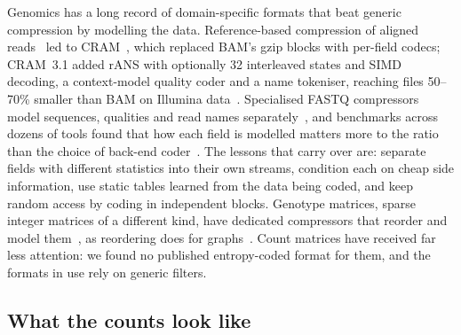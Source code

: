 Genomics has a long record of domain-specific formats that beat generic compression by modelling the data.
Reference-based compression of aligned reads~\cite{fritz2011efficient} led to CRAM~\cite{cochrane2013facing}, which
replaced BAM's gzip blocks with per-field codecs; CRAM~3.1 added rANS with optionally 32 interleaved states and SIMD
decoding, a context-model quality coder and a name tokeniser, reaching files 50--70\% smaller than BAM on Illumina
data~\cite{bonfield2022cram}. Specialised FASTQ compressors model
sequences, qualities and read names separately~\cite{bonfield2013compression,chandak2019spring}, and benchmarks across
dozens of tools found that how each field is modelled matters more to the ratio than the choice of back-end
coder~\cite{numanagic2016comparison,hernaez2019genomic}.
The lessons that carry over are: separate fields with different statistics into their own streams, condition each
on cheap side information, use static tables learned from the data being coded, and keep random access by coding in
independent blocks. Genotype matrices, sparse integer matrices of a different kind, have dedicated compressors that
reorder and model them~\cite{durbin2014efficient,danek2018gtc,deorowicz2019gtshark,lan2021genozip}, as reordering does
for graphs~\cite{boldi2004webgraph,boldi2011layered,dhulipala2016compressing}. Count matrices have received far less
attention: we found no published entropy-coded format for them, and the formats in use rely on generic filters.

\subsection{What the counts look like}

